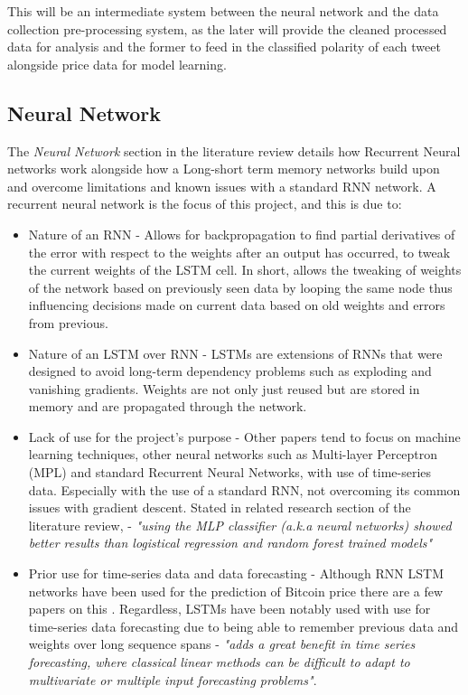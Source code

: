\documentclass[oneside, 12pt]{article}
\begin{document}
		This will be an intermediate system between the neural network and the data collection pre-processing system, as the later will provide the cleaned processed data for analysis and the former to feed in the classified polarity of each tweet alongside price data for model learning.
		
		\subsection{Neural Network}
		The \textit{Neural Network} section in the literature review details how Recurrent Neural networks work alongside how a Long-short term memory networks build upon and overcome limitations and known issues with a standard RNN network. A recurrent neural network is the focus of this project, and this is due to:
		
		\begin{itemize}
			\item Nature of an RNN - Allows for backpropagation to find partial derivatives of the error with respect to the weights after an output has occurred, to tweak the current weights of the LSTM cell. In short, allows the tweaking of weights of the network based on previously seen data by looping the same node thus influencing decisions made on current data based on old weights and errors from previous.
			\item Nature of an LSTM over RNN - LSTMs are extensions of RNNs \cite{LSTM} that were designed to avoid long-term dependency problems such as exploding and vanishing gradients. Weights are not only just reused but are stored in memory and are propagated through the network.
			\item Lack of use for the project's purpose - Other papers tend to focus on machine learning techniques, other neural networks such as Multi-layer Perceptron (MPL) and standard Recurrent Neural Networks, with use of time-series data. Especially with the use of a standard RNN, not overcoming its common issues with gradient descent. Stated in related research section of the literature review, \cite{StPNSentA} - \textit{"using the MLP classifier (a.k.a neural networks) showed better results than logistical regression and random forest trained models"}
			\item Prior use for time-series data and data forecasting - Although RNN LSTM networks have been used for the prediction of Bitcoin price there are a few papers on this \cite{LSTMforetime}. Regardless, LSTMs have been notably used with use for time-series data forecasting due to being able to remember previous data and weights over long sequence spans \cite{LSTMforetime} - \textit{"adds a great benefit in time series forecasting, where classical linear methods can be difficult to adapt to multivariate or multiple input forecasting problems"}.
		\end{itemize}
	
\end{document}
